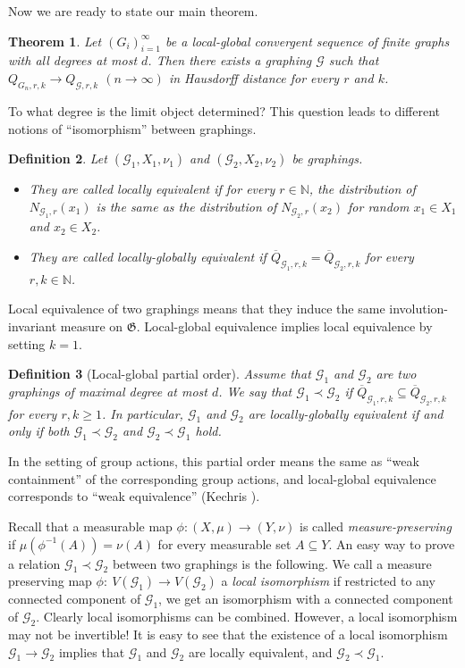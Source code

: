 \documentclass{article}
\newtheorem{theorem}{Theorem}[section]
\newtheorem{definition}[theorem]{Definition}
\def\GG{\mathcal{G}}\def\HH{\mathcal{H}}\def\II{\mathcal{I}}
\def\Gf{\mathfrak{G}}\def\Hf{\mathfrak{H}}\def\If{\mathfrak{I}}
\begin{document}
Now we are ready to state our main theorem.

\begin{theorem}
\label{thm:graphing} Let $(G_i)_{i=1}^\infty$ be a local-global
convergent sequence of finite graphs with all degrees at most $d$.
Then there exists a graphing $\GG$ such that $Q_{G_n,r,k}\to
Q_{\GG,r,k}$ $(n\to\infty)$ in Hausdorff distance for every $r$ and
$k$.
\end{theorem}

To what degree is the limit object determined? This question leads to
different notions of ``isomorphism'' between graphings.

\begin{definition}
Let  $(\GG_1,X_1,\nu_1)$ and $(\GG_2,X_2,\nu_2)$ be graphings.
\begin{itemize}
\item  They are called \emph{locally equivalent} if for every
$r\in\mathbb{N}$, the distribution of $N_{\GG_1,r}(x_1)$ is the same
as the distribution of $N_{\GG_2,r}(x_2)$ for random $x_1\in X_1$ and
$x_2\in X_2$.

\item  They are called \emph{locally-globally equivalent}
if $\overline{Q}_{\GG_1,r,k}=\overline{Q}_{\GG_2,r,k}$ for every
$r,k\in\mathbb{N}$.
\end{itemize}
\end{definition}

Local equivalence of two graphings means that they induce the same
involution-invariant measure on $\Gf$. Local-global equivalence
implies local equivalence by setting $k=1$.

\begin{definition}[Local-global partial order]
Assume that $\GG_1$ and $\GG_2$ are two graphings of maximal degree
at most $d$. We say that $\GG_1\prec\GG_2$ if
$\overline{Q}_{\GG_1,r,k}\subseteq \overline{Q}_{\GG_2,r,k}$ for
every $r,k\ge1$. In particular, $\GG_1$ and $\GG_2$ are
locally-globally equivalent if and only if both $\GG_1\prec\GG_2$ and
$\GG_2\prec\GG_1$ hold.
\end{definition}

{In the setting of group actions, this partial order means the same
as ``weak containment'' of the corresponding group actions, and
local-global equivalence corresponds to ``weak equivalence'' (Kechris
\cite{Kech}).}

Recall that a measurable map $\phi:(X,\mu) \to (Y, \nu)$ is called
{\it measure-preserving} if $\mu (\phi^{-1}(A))=\nu(A)$ for every
measurable set $A \subseteq Y$. An easy way to prove a relation
$\GG_1\prec\GG_2$ between two graphings is the following. We call a
measure preserving map $\phi:~V(\GG_1)\to V(\GG_2)$ a \emph{local
isomorphism} if restricted to any connected component of $\GG_1$, we
get an isomorphism with a connected {component} of $\GG_2$. Clearly
local isomorphisms can be combined. However, a local isomorphism may
not be invertible! It is easy to see that the existence of a local
isomorphism $\GG_1\to\GG_2$ implies that $\GG_1$ and $\GG_2$ are
locally equivalent, and $\GG_2\prec\GG_1$.
\end{document}
